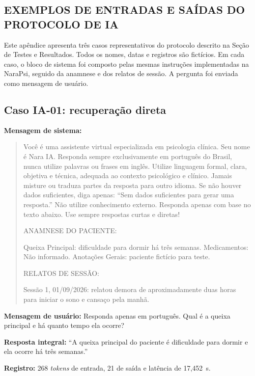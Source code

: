 \begin{apendicesenv}

\chapter{EXEMPLOS DE ENTRADAS E SAÍDAS DO PROTOCOLO DE IA}

Este apêndice apresenta três casos representativos do protocolo descrito na Seção de Testes e Resultados. Todos os nomes, datas e registros são fictícios. Em cada caso, o bloco de sistema foi composto pelas mesmas instruções implementadas na NaraPsi, seguido da anamnese e dos relatos de sessão. A pergunta foi enviada como mensagem de usuário.

\section{Caso IA-01: recuperação direta}

\textbf{Mensagem de sistema:}

\begin{quote}\small
Você é uma assistente virtual especializada em psicologia clínica. Seu nome é Nara IA. Responda sempre exclusivamente em português do Brasil, nunca utilize palavras ou frases em inglês. Utilize linguagem formal, clara, objetiva e técnica, adequada ao contexto psicológico e clínico. Jamais misture ou traduza partes da resposta para outro idioma. Se não houver dados suficientes, diga apenas: ``Sem dados suficientes para gerar uma resposta.'' Não utilize conhecimento externo. Responda apenas com base no texto abaixo. Use sempre respostas curtas e diretas!

ANAMNESE DO PACIENTE:

Queixa Principal: dificuldade para dormir há três semanas. Medicamentos: Não informado. Anotações Gerais: paciente fictício para teste.

RELATOS DE SESSÃO:

Sessão 1, 01/09/2026: relatou demora de aproximadamente duas horas para iniciar o sono e cansaço pela manhã.
\end{quote}

\textbf{Mensagem de usuário:} Responda apenas em português. Qual é a queixa principal e há quanto tempo ela ocorre?

\textbf{Resposta integral:} ``A queixa principal do paciente é dificuldade para dormir e ela ocorre há três semanas.''

\textbf{Registro:} 268 \textit{tokens} de entrada, 21 de saída e latência de 17,452~s.


\end{apendicesenv}
